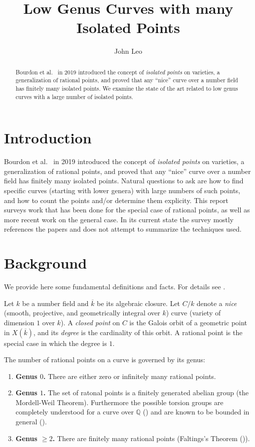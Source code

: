 \documentclass[12pt, reqno]{amsart}
\title{Low Genus Curves with many Isolated Points}
\author{John Leo}
\newcommand{\Q}{{\mathbb Q}}
\newcommand{\kbar}{{\overline{k}}}
\numberwithin{equation}{section}
\numberwithin{table}{section}
\begin{document}
\begin{abstract}
Bourdon et al.\ \cite{Bourdon2019} in 2019 introduced the concept of
\textit{isolated points} on varieties, a generalization of rational
points, and proved that any ``nice'' curve over a number field has
finitely many isolated points. We examine the state of the art related
to low genus curves with a large number of isolated points.
\end{abstract}

\maketitle

\section{Introduction}

Bourdon et al.\ \cite{Bourdon2019} in 2019 introduced the concept of
\textit{isolated points} on varieties, a generalization of rational
points, and proved that any ``nice'' curve over a number field has
finitely many isolated points. Natural questions to ask are how to find
specific curves (starting with lower genera) with large numbers of
such points, and how to count the points and/or determine them
explicity. This report surveys work that has been done for the special
case of rational points, as well as more recent work on the general
case. In its current state the survey mostly references the papers and
does not attempt to summarize the techniques used.

\section{Background}

We provide here some fundamental definitions and facts. For details
see \cite{Viray2024}.

Let $k$ be a number field and $\kbar$ be its
algebraic closure. Let $C/k$ denote a \textit{nice} (smooth,
projective, and geometrically integral over $k$) curve (variety of
dimension $1$ over $k$). A \textit{closed point} on $C$ is the Galois
orbit of a geometric point in $X(\kbar)$, and its \textit{degree} is
the cardinality of this orbit. A rational point is the special case in
which the degree is $1$.

The number of rational points on a curve is governed by its genus:
\begin{enumerate}
  \item \textbf{Genus $0$.} There are either zero or infinitely many
    rational points.
  \item \textbf{Genus $1$.} The set of ratonal points is a finitely
    generated abelian group (the Mordell-Weil Theorem). Furthermore the possible
    torsion groups are completely understood for a curve over $\Q$
    (\cites{Mazur1977, Mazur1978}) and are known to be bounded in
    general (\cite{Merel1996}).
  \item \textbf{Genus $\ge 2$.} There are finitely many rational points
    (Faltings's Theorem (\cite{Faltings1983})).
\end{enumerate}
\end{document}
